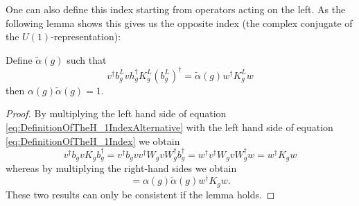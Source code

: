 \documentclass[11pt,a4paper,twoside]{article}
\numberwithin{equation}{section}
\begin{document}
	One can also define this index starting from operators acting on the left. As the following lemma shows this gives us the opposite index (the complex conjugate of the $U(1)$-representation):
	\begin{lemma}
		Define $\tilde{\alpha}(g)$ such that
		\begin{equation}\label{eq:DefinitionOfTheH_1IndexAlternative}
			v^\dagger b_g^L v h_g^\dagger K_g^L (b_g^L)^\dagger=\tilde{\alpha}(g)w^\dagger K_g^L w
		\end{equation}
		then $\alpha(g)\tilde{\alpha}(g)=1$.
	\end{lemma}
	\begin{proof}
		By multiplying the left hand side of equation \eqref{eq:DefinitionOfTheH_1IndexAlternative} with the left hand side of equation \eqref{eq:DefinitionOfTheH_1Index} we obtain
		\begin{equation}
			v^\dagger b_g v K_g b_g^\dagger=v^\dagger b_g v v^\dagger W_g v W_g^\dagger b_g^\dagger=w^\dagger v^\dagger W_g v W_g^\dagger w=w^\dagger K_g w
		\end{equation}
		whereas by multiplying the right-hand sides we obtain
		\begin{equation}
			=\alpha(g)\tilde{\alpha}(g)w^\dagger K_g w.
		\end{equation}
		These two results can only be consistent if the lemma holds.
	\end{proof}
\end{document}
